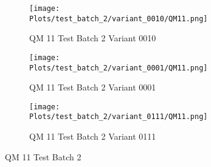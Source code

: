 \documentclass{DissertateFigs}
\begin{document}
\begin{figure}[t!]
\medskip

    \begin{subfigure}{0.47\textwidth}
    \texttt{[image: Plots/test\_batch\_2/variant\_0010/QM11.png]}
    \caption{QM 11 Test Batch 2 Variant 0010}
    \end{subfigure}
    \begin{subfigure}{0.47\textwidth}
    \texttt{[image: Plots/test\_batch\_2/variant\_0001/QM11.png]}
    \caption{QM 11 Test Batch 2 Variant 0001}
    \end{subfigure}

\medskip

    \begin{subfigure}{0.47\textwidth}
    \texttt{[image: Plots/test\_batch\_2/variant\_0111/QM11.png]}
    \caption{QM 11 Test Batch 2 Variant 0111}
    \end{subfigure}
\caption{QM 11 Test Batch 2}
    \end{figure}
\clearpage
\end{document}
